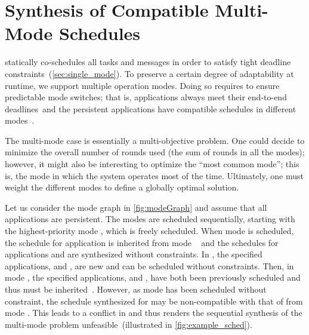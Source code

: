 
\section{Synthesis of Compatible Multi-Mode Schedules}
\label{sec:multi_mode}


\TTW statically co-schedules all tasks and messages in order to satisfy tight deadline constraints~(\cref{sec:single_mode}).
To preserve a certain degree of adaptability at runtime, we support multiple operation modes.
Doing so requires to ensure predictable mode switches; that is, applications always meet their end-to-end deadlines~\objA and the persistent applications have compatible schedules in different modes~\objB.


The multi-mode case is essentially a multi-objective problem. One could decide to minimize the overall number of rounds used (\ie the sum of rounds in all the modes); however, it might also be interesting to optimize the ``most common mode''; this is, the mode in which the system operates most of the time.
Ultimately, one must weight the different modes to define a globally optimal solution.

\squarepar{%
	Instead of solving the entire multi-mode problem at once, which would have scalability issues, we solve the problem sequentially: one mode at a time, in order of increasing priority.
	However, ensuring schedule compatibility between the different modes~\objective{2} creates dependencies, as illustrated below.%
}

\begin{example}
\label{exp:sched_conflict_basic}
	Let us consider the mode graph in \cref{fig:modeGraph} and assume that all applications are persistent.
	The modes are scheduled sequentially, starting with the highest-priority mode , which is freely scheduled.
	When mode  is scheduled, the schedule for application  is inherited from mode ~ and the schedules for applications  and  are synthesized without constraints.
	In , the specified applications,  and , are new and can be scheduled without constraints.
	Then, in mode , the specified applications,  and , have both been previously scheduled and thus must be inherited~.
	However, as mode  has been scheduled without constraint, the schedule synthesized for  may be non-compatible with that of  from mode . This leads to a conflict in  and thus renders the sequential synthesis of the multi-mode problem unfeasible~(illustrated in \cref{fig:example_sched}).
\end{example}

